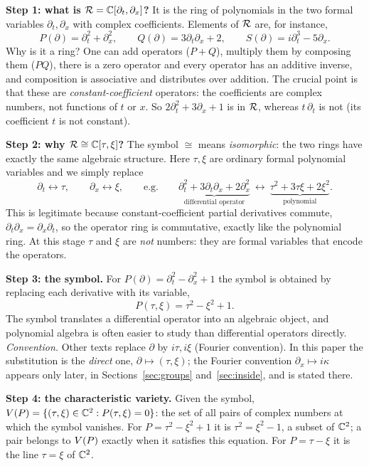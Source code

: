 \medskip\textbf{Step 1: what is $\mathcal{R}=\mathbb{C}[\partial_t,\partial_x]$?} It is the ring of polynomials in the two formal variables $\partial_t,\partial_x$ with complex coefficients. Elements of $\mathcal{R}$ are, for instance,
\[
P(\partial)=\partial_t^2+\partial_x^2,\qquad Q(\partial)=3\partial_t\partial_x+2,\qquad S(\partial)=i\partial_t^3-5\partial_x .
\]
Why is it a ring? One can add operators ($P+Q$), multiply them by composing them ($PQ$), there is a zero operator and every operator has an additive inverse, and composition is associative and distributes over addition. The crucial point is that these are \emph{constant-coefficient} operators: the coefficients are complex numbers, not functions of $t$ or $x$. So $2\partial_t^2+3\partial_x+1$ is in $\mathcal{R}$, whereas $t\,\partial_t$ is not (its coefficient $t$ is not constant).

\medskip\textbf{Step 2: why $\mathcal{R}\cong\mathbb{C}[\tau,\xi]$?} The symbol $\cong$ means \emph{isomorphic}: the two rings have exactly the same algebraic structure. Here $\tau,\xi$ are ordinary formal polynomial variables and we simply replace
\[
\partial_t\longleftrightarrow\tau,\qquad\partial_x\longleftrightarrow\xi,
\qquad\text{e.g.}\qquad
\underbrace{\partial_t^2+3\partial_t\partial_x+2\partial_x^2}_{\text{differential operator}}\ \longleftrightarrow\ \underbrace{\tau^2+3\tau\xi+2\xi^2}_{\text{polynomial}} .
\]
This is legitimate because constant-coefficient partial derivatives commute, $\partial_t\partial_x=\partial_x\partial_t$, so the operator ring is commutative, exactly like the polynomial ring. At this stage $\tau$ and $\xi$ are \emph{not} numbers: they are formal variables that encode the operators.

\medskip\textbf{Step 3: the symbol.} For $P(\partial)=\partial_t^2-\partial_x^2+1$ the symbol is obtained by replacing each derivative with its variable,
\[
P(\tau,\xi)=\tau^2-\xi^2+1 .
\]
The symbol translates a differential operator into an algebraic object, and polynomial algebra is often easier to study than differential operators directly. \emph{Convention.} Other texts replace $\partial$ by $i\tau,i\xi$ (Fourier convention). In this paper the substitution is the \emph{direct} one, $\partial\mapsto(\tau,\xi)$; the Fourier convention $\partial_x\mapsto i\kappa$ appears only later, in Sections~\ref{sec:groups} and~\ref{sec:inside}, and is stated there.

\medskip\textbf{Step 4: the characteristic variety.} Given the symbol, $V(P)=\{(\tau,\xi)\in\mathbb{C}^2:P(\tau,\xi)=0\}$: the set of all pairs of complex numbers at which the symbol vanishes. For $P=\tau^2-\xi^2+1$ it is $\tau^2=\xi^2-1$, a subset of $\mathbb{C}^2$; a pair belongs to $V(P)$ exactly when it satisfies this equation. For $P=\tau-\xi$ it is the line $\tau=\xi$ of $\mathbb{C}^2$.

